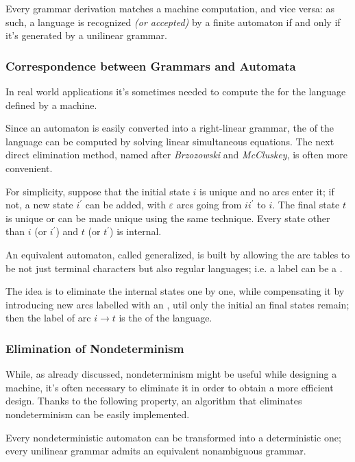 \documentclass[english]{article}
\begin{document}
Every grammar derivation matches a machine computation, and vice versa:
as such, a language is recognized \textit{(or accepted)} by a finite automaton if and only if it's generated by a unilinear grammar.

\subsubsection{Correspondence between Grammars and Automata}

In real world applications it's sometimes needed to compute the \re for the language defined by a machine.

Since an automaton is easily converted into a right-linear grammar, the \re of the language can be computed by solving linear simultaneous equations.
The next direct elimination method, named \BMC after \textit{Brzozowski} and \textit{McCluskey}, is often more convenient.

For simplicity, suppose that the initial state \(i\) is unique and no arcs enter it;
if not, a new state \(i^\prime\) can be added, with \(\varepsilon\) arcs going from \(ii^\prime\) to \(i\).
The final state \(t\) is unique or can be made unique using the same technique.
Every state other than \(i\) (or \(i^\prime\)) and \(t\) (or \(t^\prime\)) is internal.

An equivalent automaton, called generalized, is built by allowing the arc tables to be not just terminal characters but also regular languages;
i.e. a label can be a \re.

The idea is to eliminate the internal states one by one, while compensating it by introducing new arcs labelled with an \re, util only the initial an final states remain;
then the label of arc \(i \rightarrow t\) is the \re of the language.

\subsubsection{Elimination of Nondeterminism}
\label{sec:elimination-of-nondeterminism}

While, as already discussed, nondeterminism might be useful while designing a machine, it's often necessary to eliminate it in order to obtain a more efficient design.
Thanks to the following property, an algorithm that eliminates nondeterminism can be easily implemented.

Every nondeterministic automaton can be transformed into a deterministic one;
every unilinear grammar admits an equivalent nonambiguous grammar.
\end{document}
